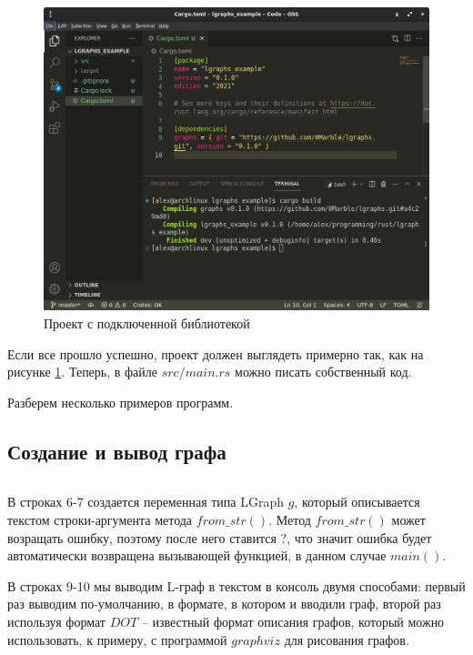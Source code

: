 \begin{figure}
    \centering
    \includegraphics[scale=0.4]{static_images/install_step3.png}
    \caption{Проект с подключенной библиотекой}
    \label{project-setup-image}
\end{figure}

Если все прошло успешно, проект должен выглядеть примерно так, как на рисунке \ref{project-setup-image}.
Теперь, в файле $src/main.rs$ можно писать собственный код.

Разберем несколько примеров программ.

\subsection{Создание и вывод графа}

\inputminted[linenos]{rust}{../lgraphs/examples/helloworld.rs} \label{helloworld-program}

В строках 6-7 создается переменная типа LGraph $g$, который описывается текстом строки-аргумента
метода $from\_str()$. Метод $from\_str()$ может возращать ошибку, поэтому после него ставится $?$, 
что значит ошибка будет автоматически возвращена вызывающей функцией, в данном случае $main()$.

В строках 9-10 мы выводим L-граф в текстом в консоль двумя способами: первый раз выводим по-умолчанию,
в формате, в котором и вводили граф, второй раз используя формат $DOT$ -- известный формат описания графов,
который можно использовать, к примеру, с программой $graphviz$ для рисования графов. 

